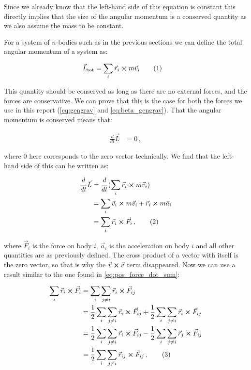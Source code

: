 \documentclass[reprint,english,notitlepage]{revtex4-1}  %
\newcommand\numberthis{\addtocounter{equation}{1}\tag{\theequation}}
\begin{document}
Since we already know that the left-hand side of this equation is constant this directly implies that the size of the angular momentum is a conserved quantity as we also assume the mass to be constant. 

For a system of $n$-bodies such as in the previous sections we can define the total angular momentum of a system as:

\begin{align*}
\vec{L}_\text{tot} &= \sum\limits_i \vec{r}_i \cross m\vec{v}_i \numberthis \label{eq:tot_ang_mom}
\end{align*}

This quantity should be conserved as long as there are no external forces, and the forces are conservative. We can prove that this is the case for both the forces we use in this report (\eqref{eq:gengrav} and \eqref{eq:beta_gengrav}). That the angular momentum is conserved means that:

\begin{align*}
\frac{d}{dt} \vec{L} &= 0 \, , 
\end{align*}

where 0 here corresponds to the zero vector technically. We find that the left-hand side of this can be written as:

\begin{align*}
\frac{d}{dt} \vec{L} &= \frac{d}{dt} (\sum\limits_i \vec{r}_i \cross m \vec{v}_i)  \\
&= \sum\limits_i \vec{v}_i \cross m \vec{v}_i + \vec{r}_i \cross m \vec{a}_i \\
&= \sum\limits_i \vec{r}_i \cross \vec{F}_i  \, , \numberthis \label{eq:interm_ang_mom_cons}
\end{align*}

where $\vec{F}_i$ is the force on body $i$, $\vec{a}_i$ is the acceleration on body $i$ and all other quantities are as previously defined. The cross product of a vector with itself is the zero vector, so that is why the $\vec{v} \cross \vec{v}$ term disappeared. Now we can use a result similar to the one found in \eqref{eq:pos_force_dot_sum}:

\begin{align*}
\sum\limits_i \vec{r}_i \cross \vec{F}_i &= \sum\limits_i \sum\limits_{j \neq i} \vec{r}_i \cross \vec{F}_{ij} \\
&= \frac{1}{2} \sum\limits_i \sum\limits_{j \neq i} \vec{r}_i \cross \vec{F}_{ij} + \frac{1}{2} \sum\limits_i \sum\limits_{j \neq i} \vec{r}_i \cross \vec{F}_{ij} \\
&= \frac{1}{2} \sum\limits_i \sum\limits_{j \neq i} \vec{r}_i \cross \vec{F}_{ij} - \frac{1}{2} \sum\limits_i \sum\limits_{j \neq i} \vec{r}_j \cross \vec{F}_{ij} \\
&= \frac{1}{2} \sum\limits_i \sum\limits_{j\neq i } \vec{r}_{ij} \cross \vec{F}_{ij} \, , \numberthis \label{eq:pos_cross_force_sum}
\end{align*}
\end{document}
